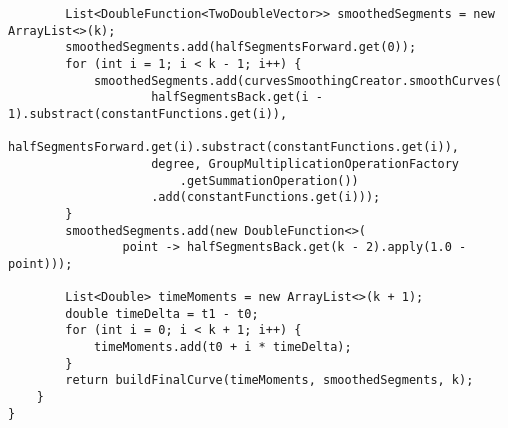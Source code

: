 \begin{verbatim}
        List<DoubleFunction<TwoDoubleVector>> smoothedSegments = new ArrayList<>(k);
        smoothedSegments.add(halfSegmentsForward.get(0));
        for (int i = 1; i < k - 1; i++) {
            smoothedSegments.add(curvesSmoothingCreator.smoothCurves(
                    halfSegmentsBack.get(i - 1).substract(constantFunctions.get(i)),
                    halfSegmentsForward.get(i).substract(constantFunctions.get(i)),
                    degree, GroupMultiplicationOperationFactory
                        .getSummationOperation())
                    .add(constantFunctions.get(i)));
        }
        smoothedSegments.add(new DoubleFunction<>(
                point -> halfSegmentsBack.get(k - 2).apply(1.0 - point)));

        List<Double> timeMoments = new ArrayList<>(k + 1);
        double timeDelta = t1 - t0;
        for (int i = 0; i < k + 1; i++) {
            timeMoments.add(t0 + i * timeDelta);
        }
        return buildFinalCurve(timeMoments, smoothedSegments, k);
    }
}
\end{verbatim}

